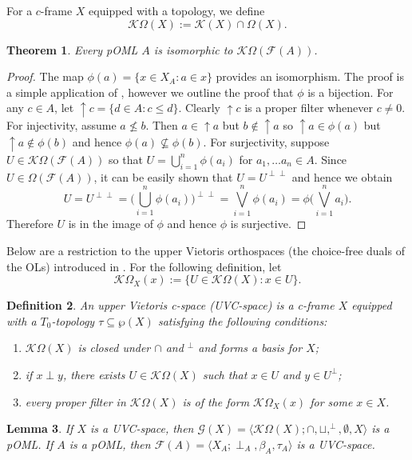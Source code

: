 \documentclass[10pt,a4paper]{amsart}
\newtheorem{theorem}{Theorem}[section]
\newtheorem{lemma}[theorem]{Lemma}
\newtheorem{definition}[theorem]{Definition}
\begin{document}
For a $c$-frame $X$ equipped with a topology, we define \[\mathcal{K}\Omega(X):=\mathcal{K}(X)\cap\Omega(X).\] 
\begin{theorem}\label{isomorphism}
    Every pOML $A$ is isomorphic to $\mathcal{K}\Omega(\mathcal{F}(A))$.  
\end{theorem}
\begin{proof}
    The map $\phi(a)=\{x\in X_A:a\in x\}$ provides an isomorphism. The proof is a simple application of \cite[Theorem 3.4.2]{mcdonald}, however we outline the proof that $\phi$ is a bijection. For any $c\in A$, let ${\uparrow}c=\{d\in A:c\leq d\}$. Clearly ${\uparrow}c$ is a proper filter whenever $c\not=0$. For injectivity, assume $a\not\leq b$. Then $a\in{\uparrow}a$ but $b\not\in{\uparrow}a$ so ${\uparrow}a\in\phi(a)$ but ${\uparrow}a\not\in\phi(b)$ and hence $\phi(a)\not\subseteq\phi(b)$. For surjectivity, suppose $U\in\mathcal{K}\Omega(\mathcal{F}(A))$ so that $U=\bigcup^n_{i=1}\phi(a_i)$ for $a_1,\dots a_n\in A$. Since $U\in\Omega(\mathcal{F}(A))$, it can be easily shown that $U=U^{\perp\perp}$ and hence we obtain \[U=U^{\perp\perp}=\biggl(\bigcup_{i=1}^n\phi(a_i)\biggl)^{\perp\perp}=\bigvee^n_{i=1}\phi(a_i)=\phi\biggl(\bigvee_{i=1}^na_i\biggl).\] Therefore $U$ is in the image of $\phi$ and hence $\phi$ is surjective. 
\end{proof}
 Below are a restriction to the upper Vietoris orthospaces (the choice-free duals of the OLs) introduced in \cite{mcdonald}. For the following definition, let \[\mathcal{K}\Omega_X(x):=\{U\in\mathcal{K}\Omega(X):x\in U\}.\]  
\begin{definition}\label{uvc-space}
    An \emph{upper Vietoris c-space} (\emph{UVC-space}) is a c-frame $X$ equipped with a $T_0$-topology $\tau\subseteq\wp(X)$ satisfying the following conditions: 
    \begin{enumerate}
        \item $\mathcal{K}\Omega(X)$ is closed under $\cap$ and $^{\perp}$ and forms a basis for $X$;
        \item if $x\perp y$, there exists $U\in\mathcal{K}\Omega(X)$ such that $x\in U$ and $y\in U^{\perp}$; 
        \item every proper filter in $\mathcal{K}\Omega(X)$ is of the form $\mathcal{K}\Omega_X(x)$ for some $x\in X$. 
    \end{enumerate}
\end{definition}
\begin{lemma}\label{functors}
    If $X$ is a UVC-space, then $\mathcal{G}(X)=\langle\mathcal{K}\Omega(X);\cap,\sqcup,^{\perp},\emptyset,X\rangle$ is a pOML. If $A$ is a pOML, then $\mathcal{F}(A)=\langle X_A;\perp_A,\beta_A,\tau_A\rangle$ is a UVC-space. 
\end{lemma}
\end{document}
